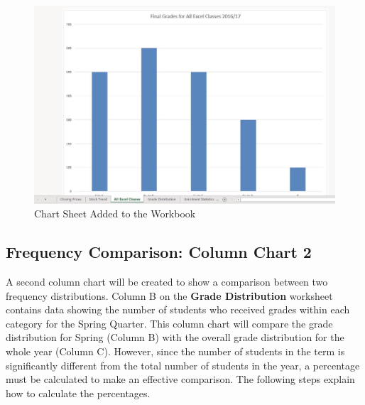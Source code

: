 \begin{figure}[H]
	\centering
	\includegraphics[width=\maxwidth{.95\linewidth}]{gfx/ch04_fig15}
	\caption{Chart Sheet Added to the Workbook}
	\label{04:fig15}
\end{figure}

\subsection{Frequency Comparison: Column Chart 2}

A second column chart will be created to show a comparison between two frequency distributions. Column B on the \textbf{Grade Distribution} worksheet contains data showing the number of students who received grades within each category for the Spring Quarter. This column chart will compare the grade distribution for Spring (Column B) with the overall grade distribution for the whole year (Column C). However, since the number of students in the term is significantly different from the total number of students in the year, a percentage must be calculated to make an effective comparison. The following steps explain how to calculate the percentages.

